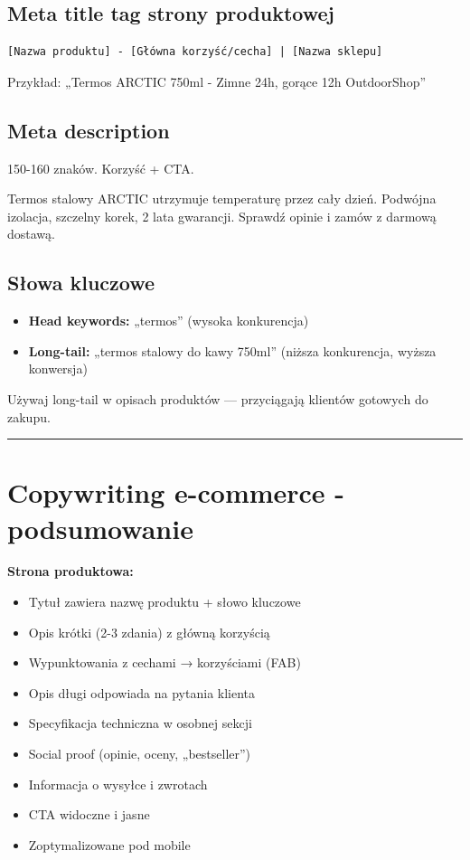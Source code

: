 \documentclass[
  12pt,
  a4paper,
  twoside,
  openright,
  12pt,
  DIV=12,
  BCOR=12mm]{scrbook}
\providecommand{\tightlist}{%
  \setlength{\itemsep}{0pt}\setlength{\parskip}{0pt}}\usepackage{longtable,booktabs,array}
\newcommand{\decoline}{%
  \begin{center}
    \textcolor{bordergray}{\rule{0.3\textwidth}{0.5pt}}
  \end{center}
}
\begin{document}
\subsection{Meta title tag strony
produktowej}\label{meta-title-tag-strony-produktowej}

\begin{verbatim}
[Nazwa produktu] - [Główna korzyść/cecha] | [Nazwa sklepu]
\end{verbatim}

Przykład: „Termos ARCTIC 750ml - Zimne 24h, gorące 12h \textbar{}
OutdoorShop''

\subsection{Meta description}\label{meta-description-1}

150-160 znaków. Korzyść + CTA.

Termos stalowy ARCTIC utrzymuje temperaturę przez cały dzień. Podwójna
izolacja, szczelny korek, 2 lata gwarancji. Sprawdź opinie i zamów z
darmową dostawą.

\subsection{Słowa kluczowe}\label{sux142owa-kluczowe}

\begin{itemize}
\tightlist
\item
  \textbf{Head keywords:} „termos'' (wysoka konkurencja)
\item
  \textbf{Long-tail:} „termos stalowy do kawy 750ml'' (niższa
  konkurencja, wyższa konwersja)
\end{itemize}

Używaj long-tail w opisach produktów --- przyciągają klientów gotowych
do zakupu.

\decoline

\section{Copywriting e-commerce -
podsumowanie}\label{copywriting-e-commerce---podsumowanie}

\textbf{Strona produktowa:}

\begin{itemize}
\tightlist
\item[$\square$]
  Tytuł zawiera nazwę produktu + słowo kluczowe
\item[$\square$]
  Opis krótki (2-3 zdania) z główną korzyścią
\item[$\square$]
  Wypunktowania z cechami → korzyściami (FAB)
\item[$\square$]
  Opis długi odpowiada na pytania klienta
\item[$\square$]
  Specyfikacja techniczna w osobnej sekcji
\item[$\square$]
  Social proof (opinie, oceny, „bestseller'')
\item[$\square$]
  Informacja o wysyłce i zwrotach
\item[$\square$]
  CTA widoczne i jasne
\item[$\square$]
  Zoptymalizowane pod mobile
\end{itemize}
\end{document}
